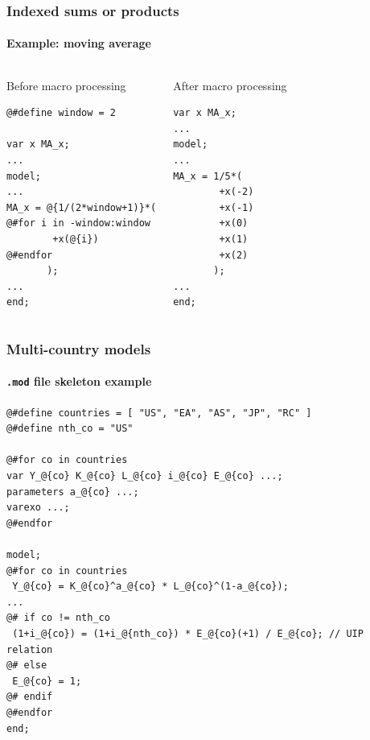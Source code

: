 \documentclass{beamer}
\begin{document}
\begin{frame}[fragile=singleslide]
  \frametitle{Indexed sums or products}
  \framesubtitle{Example: moving average}
  \begin{columns}[T]
    \begin{block}{Before macro processing}
\begin{verbatim}
@#define window = 2

var x MA_x;
...
model;
...
MA_x = @{1/(2*window+1)}*(
@#for i in -window:window
        +x(@{i})
@#endfor
       );
...
end;
\end{verbatim}
    \end{block}
    \begin{block}{After macro processing}
\begin{verbatim}
var x MA_x;
...
model;
...
MA_x = 1/5*(
        +x(-2)
        +x(-1)
        +x(0)
        +x(1)
        +x(2)
       );
...
end;
\end{verbatim}
    \end{block}
  \end{columns}
\end{frame}

\begin{frame}[fragile=singleslide]
  \frametitle{Multi-country models}
  \framesubtitle{\texttt{.mod} file skeleton example}
  \scriptsize
\begin{verbatim}
@#define countries = [ "US", "EA", "AS", "JP", "RC" ]
@#define nth_co = "US"

@#for co in countries
var Y_@{co} K_@{co} L_@{co} i_@{co} E_@{co} ...;
parameters a_@{co} ...;
varexo ...;
@#endfor

model;
@#for co in countries
 Y_@{co} = K_@{co}^a_@{co} * L_@{co}^(1-a_@{co});
...
@# if co != nth_co
 (1+i_@{co}) = (1+i_@{nth_co}) * E_@{co}(+1) / E_@{co}; // UIP relation
@# else
 E_@{co} = 1;
@# endif
@#endfor
end;
\end{verbatim}
  \normalsize
\end{frame}
\end{document}
